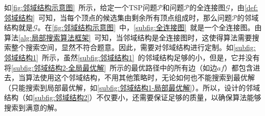 \par
如\autoref{fig:邻域结构示意图}~所示，给定一个TSP问题$\mathcal{P}$和问题$\mathcal{P}$的全连接图$\mathcal{G}$，由\autoref{def:邻域结构}~可知，当每个顶点的候选集由剩余所有顶点组成时，那么问题$\mathcal{P}$的邻域结构就是$\mathcal{G}$。在\autoref{fig:邻域结构示意图}~中，\autoref{subfig:全连接图}~就是一个全连接图。由算法\ref{alg:局部搜索算法框架}~可知，当邻域结构是全连接图时，这使得算法需要搜索整个搜索空间，显然不符合题意。因此，需要对邻域结构进行定制。如\autoref{subfig:邻域结构1}~所示，虽然\autoref{subfig:邻域结构1}~的邻域结构足够的小，但是，它并没有将\autoref{subfig:邻域结构2-全局最优解}~所示的最优路径中的所有边（如边$af$）都包含进去，当算法使用这个邻域结构，不用其他策略时，无论如何也不能搜索到最优解（只能搜索到局部最优解，如\autoref{subfig:邻域结构1-局部最优解}）。所以，设计的邻域结构（如\autoref{subfig:邻域结构2}）不仅要小，还需要保证足够的质量，以确保算法能够搜索到满意的解。

